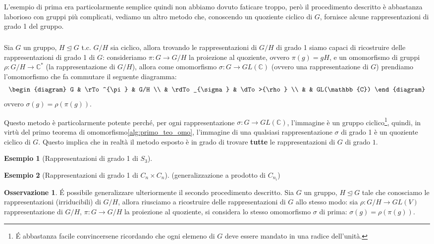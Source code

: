 \documentclass[11pt]{article}
\theoremstyle{plain}
\theoremstyle{definition}
\newtheorem{exmp}{Esempio}[section]
\newtheorem*{rem}{Osservazione}
\theoremstyle{remark}
\newcommand{\C}{\mathbb{C}}
\newcommand{\tridiag}[6]{
	  \begin{diagram}
	  #1 & \rTo^{#2}  & #3        \\
	     & \rdTo_{#6} & \dTo>{#4}   \\
	     &          & #5
	  \end{diagram}
}
\begin{document}
L'esempio di prima era particolarmente semplice quindi non abbiamo dovuto faticare troppo, però il procedimento descritto è abbastanza laborioso con gruppi più complicati, vediamo un altro metodo che, conoscendo un quoziente ciclico di $G$, fornisce alcune rappresentazioni di grado 1 del gruppo.
\subparagraph{}
Sia $G$ un gruppo, $H\trianglelefteq G$ t.c. $G/H$ sia ciclico, allora trovando le rappresentazioni di $G/H$ di grado 1 siamo capaci di ricostruire delle rappresentazioni di grado 1 di $G$: consideriamo $\pi:G\to G/H$ la proiezione al quoziente, ovvero $\pi(g)=gH$, e un omomorfismo di gruppi $\rho:G/H\to \C^*$ (la rappresentazione di $G/H$), allora come omomorfismo $\sigma:G\to GL(\C)$ (ovvero una rappresentazione di $G$) prendiamo l'omomorfismo che fa commutare il seguente diagramma:
\[\tridiag G \pi {G/H} \rho {GL(\C)} \sigma\]
ovvero $\sigma(g)=\rho(\pi(g))$.

Questo metodo è particolarmente potente perché, per ogni rappresentazione $\sigma:G\to GL(\C)$, l'immagine è un gruppo ciclico\footnote{\'E abbastanza facile convincersene ricordando che ogni elemeno di $G$ deve essere mandato in una radice dell'unità.}, quindi, in virtù del primo teorema di omomorfismo\eqref{alg:primo_teo_omo}, l'immagine di una qualsiasi rappresentazione $\sigma$ di grado 1 è un quoziente ciclico di $G$.
Questo implica che in realtà il metodo esposto è in grado di trovare \textbf{tutte} le rappresentazioni di $G$ di grado $1$.


\begin{exmp}[Rappresentazioni di grado 1 di $S_3$]

\end{exmp}

\begin{exmp}[Rappresentazioni di grado 1 di $C_n \times C_n$]


(generalizzazione a prodotto di $C_{n_i}$)
\end{exmp}

\begin{rem}
	\'E possibile generalizzare ulteriormente il secondo procedimento descritto. Sia $G$ un gruppo, $H\trianglelefteq G$ tale che conosciamo le rappresentazioni (irriducibili) di $G/H$, allora riusciamo a ricostruire delle rappresentazioni di $G$ allo stesso modo: sia $\rho:G/H\to GL(V)$ rappresentazione di $G/H$, $\pi:G\to G/H$ la proiezione al quoziente, si considera lo stesso omomorfismo $\sigma$ di prima: $\sigma(g) = \rho(\pi(g))$.
\end{rem}
\end{document}
